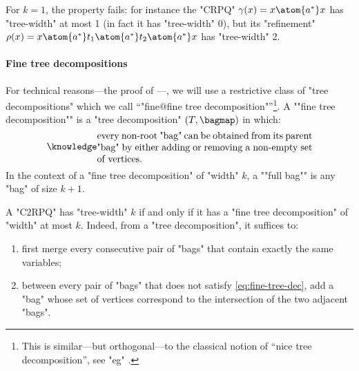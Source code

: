 For $k=1$, the property fails: for instance the "CRPQ" $\gamma(x) = x \atom{a^*} x$
has "tree-width" at most 1 (in fact it has "tree-width" 0), but its "refinement"
$\rho(x) = x \atom{a^*} t_1 \atom{a^*} t_2 \atom{a^*} x$ has "tree-width" 2.

\paragraph*{Fine tree decompositions}
\AP For technical reasons---the proof of ---, we will use a restrictive class of "tree decompositions" which we call ``"fine@fine tree decomposition"''\footnote{This is similar---but orthogonal---to the classical notion of
``nice tree decomposition'', see "eg" \cite[Definition 13.1.4, page 149]{Kloks1994Treewidth}.}. A \AP""fine tree decomposition"" is a "tree decomposition" $(T, \bagmap)$ in which:
\begin{equation}
	\AP\label{eq:fine-tree-dec}
	\parbox{.65\linewidth}{every non-root "bag" can be obtained from its parent "bag" by
	either adding or removing a non-empty set of vertices.}%
\end{equation}
In the context of a "fine tree decomposition" of "width" $k$, a \AP""full bag"" is any "bag" of size $k+1$.

A "C2RPQ" has "tree-width" $k$ if and only if it has a "fine tree decomposition" of "width" at most $k$. Indeed, from a "tree decomposition", it suffices to:
\begin{enumerate}
	\item first merge every consecutive pair of "bags" that contain exactly the same variables;
	\item between every pair of "bags"
	that does not satisfy \eqref{eq:fine-tree-dec}, add a "bag" whose set of vertices
	correspond to the intersection of the two adjacent "bags".
\end{enumerate}